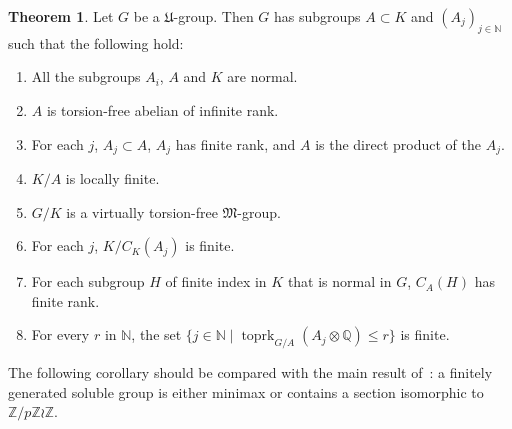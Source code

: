 \documentclass[11pt]{article}
\theoremstyle{definition}
\numberwithin{equation}{section}
\numberwithin{figure}{section}
\numberwithin{table}{section}
\newtheorem{theor}{Theorem}
\newcommand{\Q}{\mathbb{Q}}
\newcommand{\Z}{\mathbb{Z}}
\newcommand{\N}{\mathbb{N}}
\DeclareMathOperator{\toprk}{toprk}
\newcommand*{\romanenumi}{\renewcommand*{\theenumi}{\roman{enumi}}}
\begin{document}
\setcounter{theor}{1}
\begin{theor}\label{main}
Let $G$ be a $\mathfrak U$-group. Then $G$ has subgroups $A\subset K$ and $(A_j)_{j\in\N}$ such that the following hold:
\begin{enumerate}\romanenumi
\item \label{list3.1.1} All the subgroups $A_i$, $A$ and $K$ are normal.
\item \label{list3.1.2}$A$ is torsion-free abelian of infinite rank.
\item \label{list3.1.3}For each $j$, $A_j\subset A$, $A_j$ has finite rank, and $A$ is the direct product of the $A_j$.
\item \label{list3.1.4}$K/A$ is locally finite.
\item \label{list3.1.5}$G/K$ is a virtually torsion-free $\mathfrak M$-group.
\item \label{list3.1.6}For each $j$, $K/C_K(A_j)$ is finite.
\item \label{list3.1.7}For each subgroup $H$ of finite index in $K$ that is normal in $G$, $C_A(H)$ has finite rank.
\item \label{list3.1.8}For every $r$ in $\N$, the set $\{ j \in \N \mid \toprk_{G/A} (A_j\otimes \Q) \leq r \}$ is finite.
\end{enumerate}
\end{theor}

The following corollary should be compared with the main result of~\cite{K84}: a finitely generated soluble group is either minimax or contains a section isomorphic to $\Z/p\Z\wr \Z$.
\end{document}
